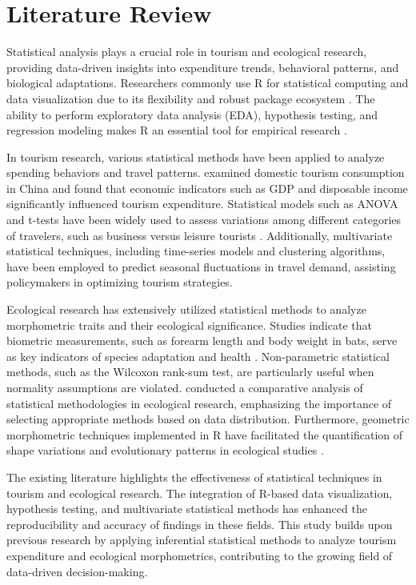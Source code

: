 \section{Literature Review}
Statistical analysis plays a crucial role in tourism and ecological research, providing data-driven insights into expenditure trends, behavioral patterns, and biological adaptations. Researchers commonly use R for statistical computing and data visualization due to its flexibility and robust package ecosystem \citep{0_ihaka1996r}. The ability to perform exploratory data analysis (EDA), hypothesis testing, and regression modeling makes R an essential tool for empirical research \citep{wickham2016getting}.

In tourism research, various statistical methods have been applied to analyze spending behaviors and travel patterns. \citet{ding2018analysis} examined domestic tourism consumption in China and found that economic indicators such as GDP and disposable income significantly influenced tourism expenditure. Statistical models such as ANOVA and t-tests have been widely used to assess variations among different categories of travelers, such as business versus leisure tourists \citep{milenkovski2019statistical}. Additionally, multivariate statistical techniques, including time-series models and clustering algorithms, have been employed to predict seasonal fluctuations in travel demand, assisting policymakers in optimizing tourism strategies.

Ecological research has extensively utilized statistical methods to analyze morphometric traits and their ecological significance. Studies indicate that biometric measurements, such as forearm length and body weight in bats, serve as key indicators of species adaptation and health \citep{davis2023writing}. Non-parametric statistical methods, such as the Wilcoxon rank-sum test, are particularly useful when normality assumptions are violated. \citet{davis2023writing} conducted a comparative analysis of statistical methodologies in ecological research, emphasizing the importance of selecting appropriate methods based on data distribution. Furthermore, geometric morphometric techniques implemented in R have facilitated the quantification of shape variations and evolutionary patterns in ecological studies \citep{adams2013geomorph}.

The existing literature highlights the effectiveness of statistical techniques in tourism and ecological research. The integration of R-based data visualization, hypothesis testing, and multivariate statistical methods has enhanced the reproducibility and accuracy of findings in these fields. This study builds upon previous research by applying inferential statistical methods to analyze tourism expenditure and ecological morphometrics, contributing to the growing field of data-driven decision-making.

